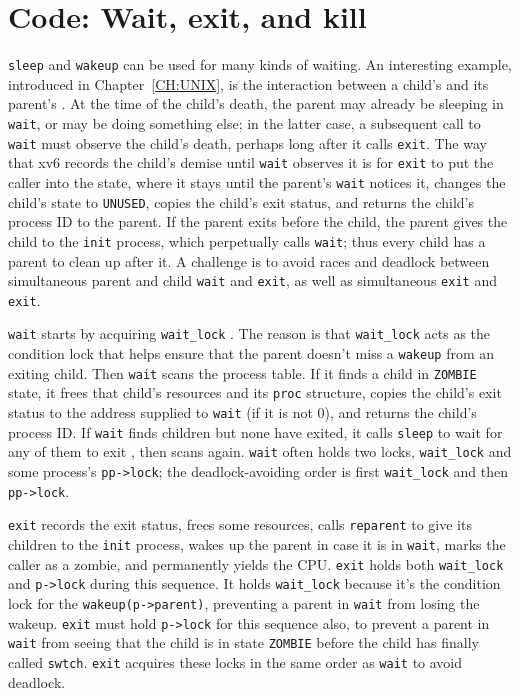 \section{Code: Wait, exit, and kill}
\lstinline{sleep}
and
\lstinline{wakeup}
can be used for many kinds of waiting.
An interesting example, introduced in Chapter~\ref{CH:UNIX},
is the interaction between a child's 
and its parent's .
At the time of the child's death, the parent may already
be sleeping in {\tt wait}, or may be doing something else;
in the latter case, a subsequent call to {\tt wait} must
observe the child's death, perhaps long after it calls {\tt exit}.
The way that xv6 records the child's demise until {\tt wait}
observes it is for {\tt exit} to put the caller into the 
state, where it stays until the parent's {\tt wait} notices it, changes
the child's state to {\tt UNUSED}, copies the child's exit status,
and returns the child's process ID to the parent.
If the parent exits before the child, the 
parent gives the child to the
\lstinline{init}
process, which perpetually calls {\tt wait};
thus
every child has a parent to clean up after it.
A challenge is
to avoid races and deadlock between
simultaneous parent and child
\lstinline{wait}
and
\lstinline{exit},
as well as simultaneous
\lstinline{exit} and \lstinline{exit}.

\lstinline{wait} starts by acquiring
\lstinline{wait_lock}
.
The reason is that \lstinline{wait_lock} acts as the condition
lock that helps ensure that the parent doesn't miss a \lstinline{wakeup}
from an exiting child.
Then \lstinline{wait} scans the process table.
If it finds a child in \texttt{ZOMBIE} state,
it frees that child's resources and
its \lstinline{proc} structure, copies
the child's exit status to the address supplied to \lstinline{wait}
(if it is not 0),
and returns the child's process ID.
If 
\lstinline{wait}
finds children but none have exited,
it calls
\lstinline{sleep}
to wait for any of them to exit
,
then scans again.
\lstinline{wait} often holds two locks,
\lstinline{wait_lock} and some process's \lstinline{pp->lock};
the deadlock-avoiding order is first \lstinline{wait_lock}
and then \lstinline{pp->lock}.

\lstinline{exit}  records the exit
status, frees some resources, calls \lstinline{reparent} to give its
children to the \lstinline{init} process, wakes up the parent in case
it is in \lstinline{wait}, marks the caller as a zombie, and
permanently yields the CPU. \lstinline{exit} holds both
\lstinline{wait_lock} and \lstinline{p->lock} during this
sequence.
It holds \lstinline{wait_lock} because 
it's the condition
lock for the \lstinline{wakeup(p->parent)}, preventing a parent in
\lstinline{wait} from losing the wakeup. \lstinline{exit} must hold
\lstinline{p->lock} for this sequence also, to prevent a parent in
\lstinline{wait} from seeing that the child is in state
\lstinline{ZOMBIE} before the child has finally called
\lstinline{swtch}. \lstinline{exit} acquires these locks in
the same order as \lstinline{wait} to avoid deadlock.

